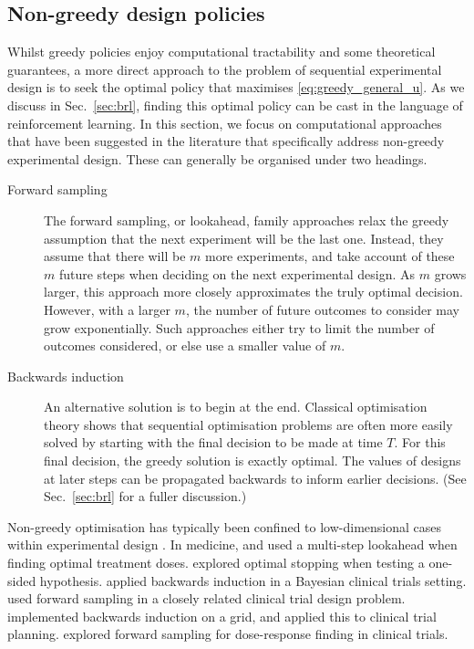 \documentclass[a4paper, 10pt]{report}
\theoremstyle{plain}
\begin{document}
	
	\subsection{Non-greedy design policies}
	
	Whilst greedy policies enjoy computational tractability and some theoretical guarantees, a more direct approach to the problem of sequential experimental design is to seek the optimal policy that maximises \eqref{eq:greedy_general_u}.
	As we discuss in Sec.~\ref{sec:brl}, finding this optimal policy can be cast in the language of reinforcement learning. In this section, we focus on computational approaches that have been suggested in the literature that specifically address non-greedy experimental design. These can generally be organised under two headings.
	
	\begin{description}
		\item[Forward sampling] The forward sampling, or lookahead, family approaches relax the greedy assumption that the next experiment will be the last one.
		Instead, they assume that there will be $m$ more experiments, and take account of these $m$ future steps when deciding on the next experimental design.
		As $m$ grows larger, this approach more closely approximates the truly optimal decision.
		However, with a larger $m$, the number of future outcomes to consider may grow exponentially.
		Such approaches either try to limit the number of outcomes considered, or else use a smaller value of $m$.
		\item[Backwards induction] An alternative solution is to begin at the end. 
		Classical optimisation theory \citep{bellman1966dynamic} shows that sequential optimisation problems are often more easily solved by starting with the final decision to be made at time $T$.
		For this final decision, the greedy solution is exactly optimal. 
		The values of designs at later steps can be propagated backwards to inform earlier decisions.
		(See Sec.~\ref{sec:brl} for a fuller discussion.)
	\end{description}
	
	
	Non-greedy optimisation has typically been confined to low-dimensional cases within experimental design \citep{ryan2016review}.
	In medicine, \citet{whitehead1995bayesian} and \citet{whitehead1998bayesian} used a multi-step lookahead when finding optimal treatment doses.
	\citet{berry1988one} explored optimal stopping when testing a one-sided hypothesis.
	\citet{lewis1994group} applied backwards induction in a Bayesian clinical trials setting.
	\citet{carlin1998approaches} used forward sampling in a closely related clinical trial design problem.
	\citet{brockwell2003gridding} implemented backwards induction on a grid, and applied this to clinical trial planning.
	\citet{muller2006bayesian} explored forward sampling for dose-response finding in clinical trials.
	
\end{document}

